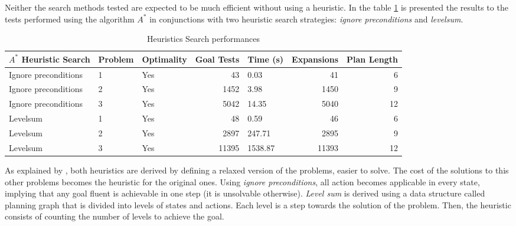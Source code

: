 \documentclass[a4paper]{article}
\begin{document}


Neither the search methods tested are expected to be much efficient without using a heuristic. In the table \ref{tab:final_results2} is presented the results to the tests performed using the algorithm $A^{*}$ in conjunctions with two heuristic search strategies: \textit{ignore preconditions} and \textit{levelsum}.

\begin{table}[ht!]
\centering
\begin{tabular}{lllrlrr}
{$A^{*}$ Heuristic Search} & Problem & Optimality & Goal Tests & Time (s) & Expansions & Plan Length \\
\midrule
Ignore preconditions &       1 &         Yes &        43 &         0.03 &        41 &           6 \\
Ignore preconditions &       2 &         Yes &      1452 &         3.98 &      1450 &           9 \\
Ignore preconditions &       3 &         Yes &      5042 &        14.35 &      5040 &          12 \\
Levelsum          &       1 &         Yes &        48 &         0.59 &        46 &           6 \\
Levelsum          &       2 &         Yes &      2897 &       247.71 &      2895 &           9 \\
Levelsum          &       3 &         Yes &     11395 &      1538.87 &     11393 &          12 \\
\end{tabular}
\caption{\label{tab:final_results2}Heuristics Search performances}
\end{table}


As explained by \cite{russelartificial}, both heuristics are derived by defining a relaxed version of the problems, easier to solve. The cost of the solutions to this other problems becomes the heuristic for the original ones. Using \textit{ignore preconditions}, all action becomes applicable in every state, implying that any goal fluent is achievable in one step (it is unsolvable otherwise). \textit{Level sum} is derived using a data structure called planning graph that is divided into levels of states and actions. Each level is a step towards the solution of the problem. Then, the heuristic consists of counting the number of levels to achieve the goal.

\end{document}
